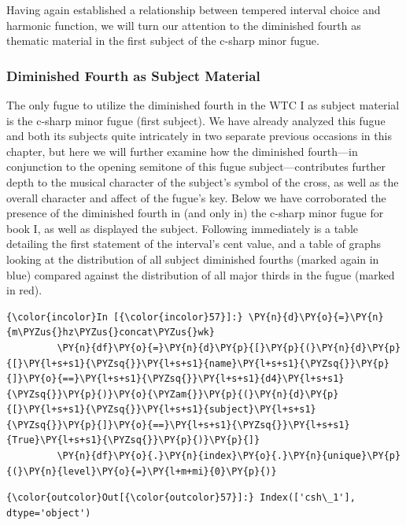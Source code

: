 Having again established a relationship between tempered interval choice
and harmonic function, we will turn our attention to the diminished
fourth as thematic material in the first subject of the c-sharp minor
fugue.

    \subsubsection{Diminished Fourth as Subject
Material}\label{diminished-fourth-as-subject-material}

The only fugue to utilize the diminished fourth in the WTC I as subject
material is the c-sharp minor fugue (first subject). We have already
analyzed this fugue and both its subjects quite intricately in two
separate previous occasions in this chapter, but here we will further
examine how the diminished fourth---in conjunction to the opening
semitone of this fugue subject---contributes further depth to the
musical character of the subject's symbol of the cross, as well as the
overall character and affect of the fugue's key. Below we have
corroborated the presence of the diminished fourth in (and only in) the
c-sharp minor fugue for book I, as well as displayed the subject.
Following immediately is a table detailing the first statement of the
interval's cent value, and a table of graphs looking at the distribution
of all subject diminished fourths (marked again in blue) compared
against the distribution of all major thirds in the fugue (marked in
red).

    \begin{Verbatim}[commandchars=\\\{\}]
{\color{incolor}In [{\color{incolor}57}]:} \PY{n}{d}\PY{o}{=}\PY{n}{m\PYZus{}hz\PYZus{}concat\PYZus{}wk}
         \PY{n}{df}\PY{o}{=}\PY{n}{d}\PY{p}{[}\PY{p}{(}\PY{n}{d}\PY{p}{[}\PY{l+s+s1}{\PYZsq{}}\PY{l+s+s1}{name}\PY{l+s+s1}{\PYZsq{}}\PY{p}{]}\PY{o}{==}\PY{l+s+s1}{\PYZsq{}}\PY{l+s+s1}{d4}\PY{l+s+s1}{\PYZsq{}}\PY{p}{)}\PY{o}{\PYZam{}}\PY{p}{(}\PY{n}{d}\PY{p}{[}\PY{l+s+s1}{\PYZsq{}}\PY{l+s+s1}{subject}\PY{l+s+s1}{\PYZsq{}}\PY{p}{]}\PY{o}{==}\PY{l+s+s1}{\PYZsq{}}\PY{l+s+s1}{True}\PY{l+s+s1}{\PYZsq{}}\PY{p}{)}\PY{p}{]}
         \PY{n}{df}\PY{o}{.}\PY{n}{index}\PY{o}{.}\PY{n}{unique}\PY{p}{(}\PY{n}{level}\PY{o}{=}\PY{l+m+mi}{0}\PY{p}{)}
\end{Verbatim}
\begin{Verbatim}[commandchars=\\\{\}]
{\color{outcolor}Out[{\color{outcolor}57}]:} Index(['csh\_1'], dtype='object')
\end{Verbatim}


